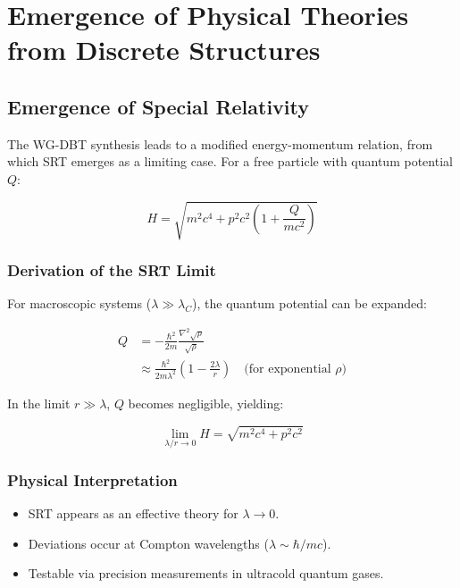 \section{Emergence of Physical Theories from Discrete Structures}  
\label{sec:emergence_discussion}  

\subsection{Emergence of Special Relativity}  
\label{subsec:srt_emergence}  

The WG-DBT synthesis leads to a modified energy-momentum relation, from which SRT emerges as a limiting case. For a free particle with quantum potential $Q$:  

\begin{equation}  
H = \sqrt{m^2c^4 + p^2c^2\left(1 + \frac{Q}{mc^2}\right)}  
\end{equation}  

\subsubsection{Derivation of the SRT Limit}  
For macroscopic systems ($\lambda \gg \lambda_C$), the quantum potential can be expanded:  

\begin{align}  
Q &= -\frac{\hbar^2}{2m}\frac{\nabla^2\sqrt{\rho}}{\sqrt{\rho}} \\  
&\approx \frac{\hbar^2}{2m\lambda^2}\left(1 - \frac{2\lambda}{r}\right) \quad \text{(for exponential $\rho$)}  
\end{align}  

In the limit $r \gg \lambda$, $Q$ becomes negligible, yielding:  

\begin{equation}  
\lim_{\lambda/r \to 0} H = \sqrt{m^2c^4 + p^2c^2}  
\end{equation}  

\subsubsection{Physical Interpretation}  
\begin{itemize}  
\item SRT appears as an effective theory for $\lambda \to 0$.  
\item Deviations occur at Compton wavelengths ($\lambda \sim \hbar/mc$).  
\item Testable via precision measurements in ultracold quantum gases.  
\end{itemize}  

